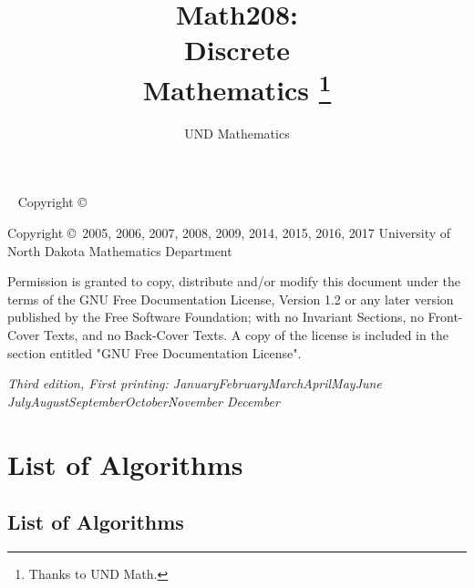 \documentclass[letterpaper, twoside]{tufte-book}
\title{Math208:\\Discrete\\Mathematics %
\thanks{Thanks to UND Math.}}
\author[UND Math Book Developers]{UND Mathematics}
\makeatletter
\newcommand{\monthyear}{%
  \ifcase\month\or January\or February\or March\or April\or May\or June\or
  July\or August\or September\or October\or November\or
  December\fi\space\number\year
}
\newcounter{algrthm}[chapter]
\newcommand\listalgrthmname{List of Algorithms}
\newcommand\listofalgrthms{%
  \ifthenelse{\equal{\@tufte@class}{book}}%
    {\chapter*{\listalgrthmname}}%
    {\section*{\listalgrthmname}}%
    \@starttoc{loa}%
}
\makeatother
\begin{document}
\frontmatter

\maketitle

\newpage
\begin{fullwidth}
~\vfill
\thispagestyle{empty}
\setlength{\parindent}{0pt}
\setlength{\parskip}{\baselineskip}
Copyright \copyright\ \the\year\ \thanklessauthor

\par{}

\par{}


\noindent Copyright \copyright\  
2005, 2006, 2007, 2008, 2009, 2014, 2015, 2016, 2017 University of North Dakota Mathematics Department
\par
 Permission is granted to copy, distribute and/or modify this document
    under the terms of the GNU Free Documentation License, Version 1.2
    or any later version published by the Free Software Foundation;
    with no Invariant Sections, no Front-Cover Texts, and no Back-Cover Texts.
    A copy of the license is included in the section entitled "GNU
    Free Documentation License".

\par\textit{Third edition, First printing: \monthyear} 
\end{fullwidth}

\tableofcontents

\listoffigures

\listoftables

\listofalgrthms




\cleardoublepage
\mainmatter


\cleardoublepage
\end{document}
